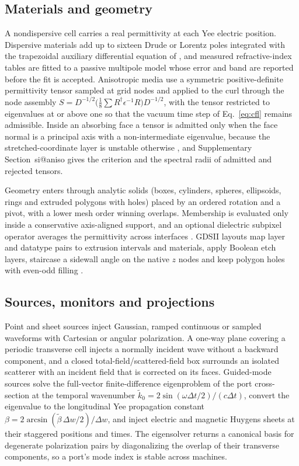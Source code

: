 \documentclass[preprint,11pt]{elsarticle}
\makeatletter
\newcommand{\suppsec}[1]{Supplementary Section~\csname si@#1\endcsname}
\makeatother
\begin{document}
\subsection{Materials and geometry}

A nondispersive cell carries a real permittivity at each Yee electric position. Dispersive materials add up to sixteen Drude or Lorentz poles integrated with the trapezoidal auxiliary differential equation of \citet{okoniewski1997}, and measured refractive-index tables are fitted to a passive multipole model whose error and band are reported before the fit is accepted. Anisotropic media \citep{oskooi2009} use a symmetric positive-definite permittivity tensor sampled at grid nodes and applied to the curl through the node assembly $S=D^{-1/2}\bigl(\tfrac18\sum R^{\dagger}\epsilon^{-1}R\bigr)D^{-1/2}$, with the tensor restricted to eigenvalues at or above one so that the vacuum time step of Eq.~\eqref{eq:cfl} remains admissible. Inside an absorbing face a tensor is admitted only when the face normal is a principal axis with a non-intermediate eigenvalue, because the stretched-coordinate layer is unstable otherwise \citep{becache2003}, and \suppsec{aniso} gives the criterion and the spectral radii of admitted and rejected tensors.

Geometry enters through analytic solids (boxes, cylinders, spheres, ellipsoids, rings and extruded polygons with holes) placed by an ordered rotation and a pivot, with a lower mesh order winning overlaps. Membership is evaluated only inside a conservative axis-aligned support, and an optional dielectric subpixel operator averages the permittivity across interfaces \citep{farjadpour2006}. GDSII layouts map layer and datatype pairs to extrusion intervals and materials, apply Boolean etch layers, staircase a sidewall angle on the native $z$ nodes and keep polygon holes with even-odd filling \citep{gdstk}.

\subsection{Sources, monitors and projections}

Point and sheet sources inject Gaussian, ramped continuous or sampled waveforms with Cartesian or angular polarization. A one-way plane covering a periodic transverse cell injects a normally incident wave without a backward component, and a closed total-field/scattered-field box \citep{schneider2010} surrounds an isolated scatterer with an incident field that is corrected on its faces. Guided-mode sources solve the full-vector finite-difference eigenproblem of the port cross-section \citep{zhu2002} at the temporal wavenumber $\tilde k_0=2\sin(\omega\Delta t/2)/(c\Delta t)$, convert the eigenvalue to the longitudinal Yee propagation constant $\beta=2\arcsin(\tilde\beta\,\Delta w/2)/\Delta w$, and inject electric and magnetic Huygens sheets at their staggered positions and times. The eigensolver returns a canonical basis for degenerate polarization pairs by diagonalizing the overlap of their transverse components, so a port's mode index is stable across machines.
\end{document}
